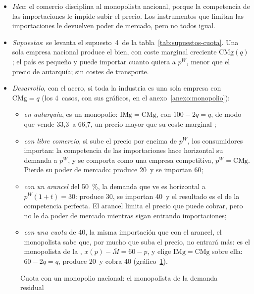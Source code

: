\documentclass[11pt]{article}
\begin{document}
\begin{itemize}
\item \emph{Idea}: el comercio disciplina al monopolista nacional, porque la competencia de las importaciones le impide subir el precio. Los instrumentos que limitan las importaciones le devuelven poder de mercado, pero no todos igual\nocite{Bhagwati1965Equivalence}.
\item \emph{Supuestos}: se levanta el supuesto~4~de la tabla~\ref{tab:supuestos-cuota}. Una sola empresa nacional produce el bien, con coste marginal creciente $\mathrm{CMg}(q)$; el país es pequeño y puede importar cuanto quiera a $p^W$, menor que el precio de autarquía; sin costes de transporte.
\item \emph{Desarrollo}, con el acero, si toda la industria es una sola empresa con $\mathrm{CMg}=q$ (los 4~casos, con sus gráficos, en el anexo~\ref{anexo:monopolio}):
  \begin{itemize}
  \item \emph{en autarquía}, es un monopolio: $\mathrm{IMg}=\mathrm{CMg}$, con $100-2q=q$, de modo que vende 33,3~a 66,7, un precio mayor que su coste marginal ;
  \item \emph{con libre comercio}, si sube el precio por encima de $p^W$, los consumidores importan: la competencia de las importaciones hace horizontal su demanda a $p^W$, y se comporta como una empresa competitiva, $p^W=\mathrm{CMg}$. Pierde su poder de mercado: produce 20~y se importan 60;
  \item \emph{con un arancel} del 50~\%, la demanda que ve es horizontal a $p^W(1+t)=30$: produce 30, se importan 40~y el resultado es el de la competencia perfecta. El arancel limita el precio que puede cobrar, pero no le da poder de mercado mientras sigan entrando importaciones;
  \item \emph{con una cuota} de 40, la misma importación que con el arancel, el monopolista sabe que, por mucho que suba el precio, no entrará más: es el monopolista de la , $x(p)-\bar M=60-p$, y elige $\mathrm{IMg}=\mathrm{CMg}$ sobre ella: $60-2q=q$, produce 20~y cobra 40 (gráfico~\ref{fig:cuota-monopolio}).
  \end{itemize}
\end{itemize}
\begin{figure}[H]
\centering
\caption{Cuota con un monopolio nacional: el monopolista de la demanda residual}\label{fig:cuota-monopolio}
\end{figure}
\end{document}
